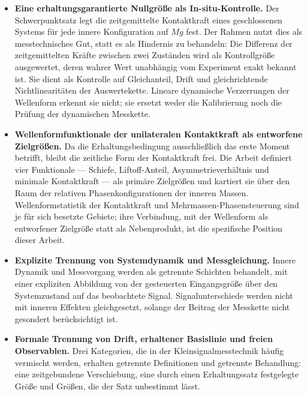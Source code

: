 \documentclass[12pt,a4paper]{report}
\begin{document}
\begin{itemize}

  \item \textbf{Eine erhaltungsgarantierte Nullgröße als In-situ-Kontrolle.}
        Der Schwerpunktsatz legt die zeitgemittelte Kontaktkraft eines
        geschlossenen Systems für jede innere Konfiguration auf $Mg$
        fest. Der Rahmen nutzt dies als messtechnisches Gut, statt es als
        Hindernis zu behandeln: Die Differenz der zeitgemittelten Kräfte
        zwischen zwei Zuständen wird als Kontrollgröße ausgewertet, deren
        wahrer Wert unabhängig vom Experiment exakt bekannt ist. Sie
        dient als Kontrolle auf Gleichanteil, Drift und gleichrichtende
        Nichtlinearitäten der Auswertekette. Lineare dynamische
        Verzerrungen der Wellenform erkennt sie nicht; sie ersetzt weder
        die Kalibrierung noch die Prüfung der dynamischen Messkette.

  \item \textbf{Wellenformfunktionale der unilateralen Kontaktkraft als
        entworfene Zielgrößen.}
        Da die Erhaltungsbedingung ausschließlich das erste Moment
        betrifft, bleibt die zeitliche Form der Kontaktkraft frei. Die
        Arbeit definiert vier Funktionale --- Schiefe, Liftoff-Anteil,
        Asymmetrieverhältnis und minimale Kontaktkraft --- als primäre
        Zielgrößen und kartiert sie über den Raum der relativen
        Phasenkonfigurationen der inneren Massen. Wellenformstatistik der
        Kontaktkraft und Mehrmassen-Phasensteuerung sind je für sich
        besetzte Gebiete; ihre Verbindung, mit der Wellenform als
        entworfener Zielgröße statt als Nebenprodukt, ist die spezifische
        Position dieser Arbeit.

  \item \textbf{Explizite Trennung von Systemdynamik und Messgleichung.}
        Innere Dynamik und Messvorgang werden als getrennte Schichten
        behandelt, mit einer expliziten Abbildung von der gesteuerten
        Eingangsgröße über den Systemzustand auf das beobachtete Signal.
        Signalunterschiede werden nicht mit inneren Effekten
        gleichgesetzt, solange der Beitrag der Messkette nicht gesondert
        berücksichtigt ist.

  \item \textbf{Formale Trennung von Drift, erhaltener Basislinie und
        freien Observablen.}
        Drei Kategorien, die in der Kleinsignalmesstechnik häufig
        vermischt werden, erhalten getrennte Definitionen und getrennte
        Behandlung: eine zeitgebundene Verschiebung, eine durch einen
        Erhaltungssatz festgelegte Größe und Größen, die der Satz
        unbestimmt lässt.


\end{itemize}
\end{document}
